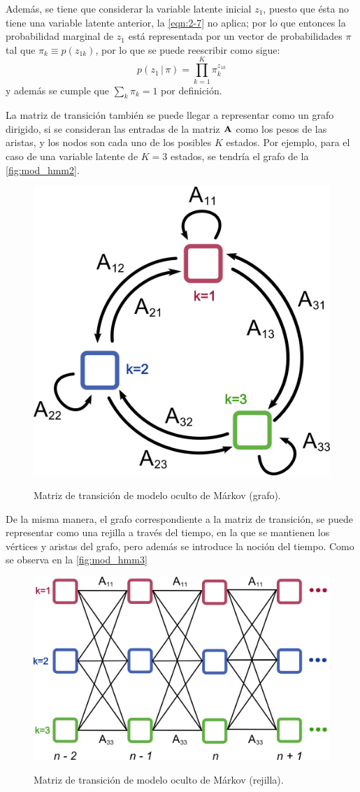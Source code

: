 Además, se tiene que considerar la variable latente inicial $z_1$, puesto que ésta no tiene una variable latente anterior, la \autoref{eqn:2-7} no aplica; por lo que entonces la probabilidad marginal de $z_1$ está representada por un vector de probabilidades $\pi$ tal que $\pi_k \equiv p(z_{1k})$, por lo que se puede reescribir como sigue: 
\begin{equation}
p(z_1 \,|\, \pi) = \prod_{k=1}^K \pi_k^{z_{1k}}
\label{eqn:2-9}
\end{equation}
y además se cumple que $\sum_k \pi_k = 1$ por definición.

La matriz de transición también se puede llegar a representar como un grafo dirigido, si se consideran las entradas de la matriz $\textbf{A}$ como los pesos de las aristas, y los nodos son cada uno de los posibles $K$ estados. Por ejemplo, para el caso de una variable latente de $K = 3$ estados, se tendría el grafo de la \autoref{fig:mod_hmm2}.

\begin{figure}[hbt]
        \myfloatalign
        {\includegraphics[width=0.4\linewidth]{gfx/chap2/mod-hmm2}}
        \caption{Matriz de transición de modelo oculto de Márkov (grafo).}
        \label{fig:mod_hmm2}
\end{figure}

De la misma manera, el grafo correspondiente a la matriz de transición, se puede representar como una rejilla a través del tiempo, en la que se mantienen los vértices y aristas del grafo, pero además se introduce la noción del tiempo. Como se observa en la \autoref{fig:mod_hmm3} 

\begin{figure}[hbt]
        \myfloatalign
        {\includegraphics[width=0.63\linewidth]{gfx/chap2/mod-hmm3}}
        \caption{Matriz de transición de modelo oculto de Márkov (rejilla).}
        \label{fig:mod_hmm3}
\end{figure}


